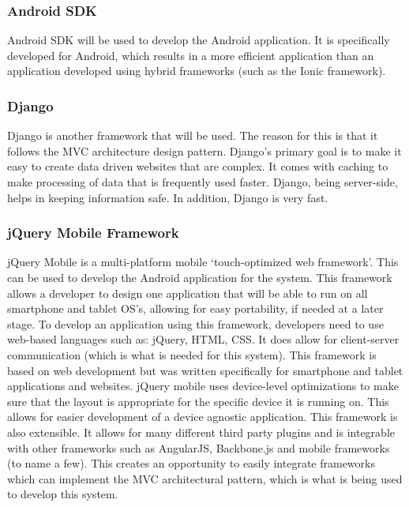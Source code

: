 \documentclass[a4paper,12pt]{article}
\begin{document}
\subsubsection{Android SDK}Android SDK will be used to develop the Android application. It is specifically developed for Android, which results in a more efficient application than an application developed using hybrid frameworks (such as the Ionic framework).\par 
\subsubsection{Django}Django is another framework that will be used. The reason for this is that it follows the MVC architecture design pattern. Django’s primary goal is to make it easy to create data driven websites that are complex. It comes with caching to make processing of data that is frequently used faster. Django, being server-side, helps in keeping information safe. In addition, Django is very fast.

\subsubsection{jQuery Mobile Framework}
jQuery Mobile is a multi-platform mobile `touch-optimized web framework'. This can be used to develop the Android application for the system. This framework allows a developer to design one application that will be able to run on all smartphone and tablet OS's, allowing for easy portability, if needed at a later stage. To develop an application using this framework, developers need to use web-based languages such as: jQuery, HTML, CSS. It does allow for client-server communication (which is what is needed for this system). This framework is based on web development but was written specifically for smartphone and tablet applications and websites. jQuery mobile uses device-level optimizations to make sure that the layout is appropriate for the specific device it is running on. This allows for easier development of a device agnostic application. This framework is also extensible. It allows for many different third party plugins and is integrable with other frameworks such as AngularJS, Backbone.js and mobile frameworks (to name a few). This creates an opportunity to easily integrate frameworks which can implement the MVC architectural pattern, which is what is being used to develop this system.
\end{document}
